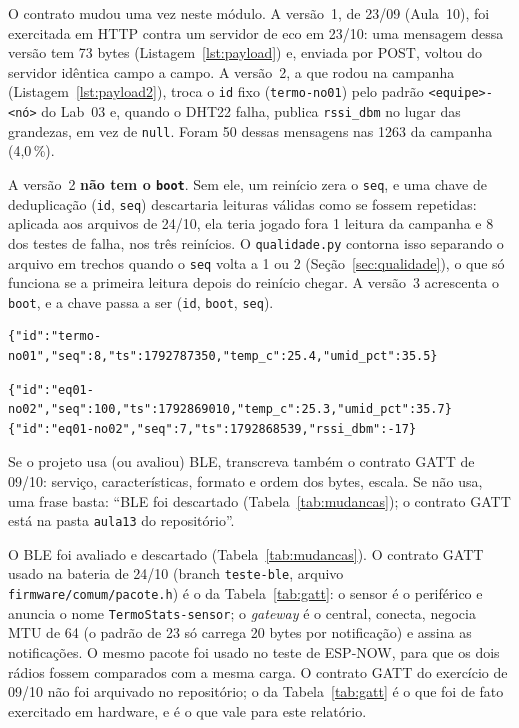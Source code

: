 O contrato mudou uma vez neste módulo. A versão~1, de 23/09 (Aula~10),
foi exercitada em HTTP contra um servidor de eco em 23/10: uma mensagem
dessa versão tem 73 bytes (Listagem~\ref{lst:payload}) e, enviada por
POST, voltou do servidor idêntica campo a campo. A versão~2, a que
rodou na campanha (Listagem~\ref{lst:payload2}), troca o \texttt{id}
fixo (\texttt{termo-no01}) pelo padrão \texttt{<equipe>-<nó>} do Lab~03
e, quando o DHT22 falha, publica \texttt{rssi\_dbm} no lugar das
grandezas, em vez de \texttt{null}. Foram 50 dessas mensagens nas
\num{1263} da campanha (4,0\,\%).

A versão~2 \textbf{não tem o \texttt{boot}}. Sem ele, um reinício zera o
\texttt{seq}, e uma chave de deduplicação (\texttt{id}, \texttt{seq})
descartaria leituras válidas como se fossem repetidas: aplicada aos
arquivos de 24/10, ela teria jogado fora 1 leitura da campanha e 8 dos
testes de falha, nos três reinícios. O \texttt{qualidade.py} contorna
isso separando o arquivo em trechos quando o \texttt{seq} volta a 1 ou 2
(Seção~\ref{sec:qualidade}), o que só funciona se a primeira leitura
depois do reinício chegar. A versão~3 acrescenta o \texttt{boot}, e a
chave passa a ser (\texttt{id}, \texttt{boot}, \texttt{seq}).

\begin{lstlisting}[style=terminal,
  caption={Uma mensagem real da versão 1 do contrato (sessão de 23/10, branch \texttt{apendice\_b})},
  label={lst:payload}]
{"id":"termo-no01","seq":8,"ts":1792787350,"temp_c":25.4,"umid_pct":35.5}
\end{lstlisting}

\begin{lstlisting}[style=terminal,
  caption={Duas mensagens reais da versão 2, copiadas do CSV da campanha: uma leitura normal e uma com o DHT22 em falha},
  label={lst:payload2}]
{"id":"eq01-no02","seq":100,"ts":1792869010,"temp_c":25.3,"umid_pct":35.7}
{"id":"eq01-no02","seq":7,"ts":1792868539,"rssi_dbm":-17}
\end{lstlisting}

\begin{orientacao}
Se o projeto usa (ou avaliou) BLE, transcreva também o contrato GATT de
09/10: serviço, características, formato e ordem dos bytes, escala. Se
não usa, uma frase basta: \enquote{BLE foi descartado (Tabela~\ref{tab:mudancas});
o contrato GATT está na pasta \texttt{aula13} do repositório}.
\end{orientacao}

O BLE foi avaliado e descartado (Tabela~\ref{tab:mudancas}). O contrato
GATT usado na bateria de 24/10 (branch \texttt{teste-ble}, arquivo
\texttt{firmware/comum/pacote.h}) é o da Tabela~\ref{tab:gatt}: o sensor
é o periférico e anuncia o nome \texttt{TermoStats-sensor}; o
\emph{gateway} é o central, conecta, negocia MTU de 64 (o padrão de 23
só carrega 20 bytes por notificação) e assina as notificações. O
mesmo pacote foi usado no teste de ESP-NOW, para que os dois rádios
fossem comparados com a mesma carga. O contrato GATT do exercício de
09/10 não foi arquivado no repositório; o da Tabela~\ref{tab:gatt} é o
que foi de fato exercitado em hardware, e é o que vale para este
relatório.

